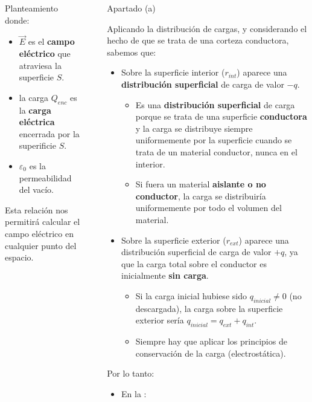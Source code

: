 \documentclass[final]{beamer}
\newlength{\sepwidth}
\newlength{\colwidth}
\newcommand{\separatorcolumn}{\begin{column}{\sepwidth}\end{column}}
\begin{document}
\begin{frame}[t]
\begin{columns}[t]
\begin{column}{\colwidth}
\begin{alertblock}{Planteamiento}
    donde:

    \begin{itemize}
      \item $\vec{E}$ es el \textbf{campo eléctrico} que atraviesa la superficie $S$.
      \item la carga $Q_{enc}$ es la \textbf{carga eléctrica} encerrada por la superificie $S$.
      \item $\varepsilon_0$ es la permeabilidad del vacío.
    \end{itemize}

    Esta relación nos permitirá calcular el campo eléctrico en cualquier punto del espacio.

  \end{alertblock}

\end{column}

\separatorcolumn

\begin{column}{\colwidth}

  \begin{block}{Apartado (a)}

    Aplicando la distribución de cargas, y considerando el hecho de que se trata de una corteza conductora, 
    sabemos que:

    \begin{itemize}
      \item Sobre la superficie interior ($r_{int}$) aparece una \textbf{distribución superficial} de carga de valor $-q$.
      \begin{itemize}
        \item Es una \textbf{distribución superficial} de carga porque se trata de una superficie \textbf{conductora} y 
        la carga se distribuye siempre uniformemente por la superficie cuando se trata de un material conductor, nunca en el interior.
        \item Si fuera un material \textbf{aislante o no conductor}, la carga se distribuiría uniformemente por todo el volumen del material.
      \end{itemize}
      \item Sobre la superficie exterior ($r_{ext}$) aparece una distribución superficial de carga de valor $+q$, ya que la 
      carga total sobre el conductor es inicialmente \textbf{sin carga}.
        \begin{itemize}
            \item Si la carga inicial hubiese sido $q_{inicial} \neq 0$ (no descargada), 
            la carga sobre la superficie exterior sería $q_{inicial} = q_{ext} + q_{int}$.
            \item Siempre hay que aplicar los principios de conservación de la carga (electrostática).
        \end{itemize}
    \end{itemize}
    Por lo tanto:
    \begin{itemize}
        \item En la :
    \end{itemize}


\end{block}
\end{column}
\end{columns}
\end{frame}
\end{document}

